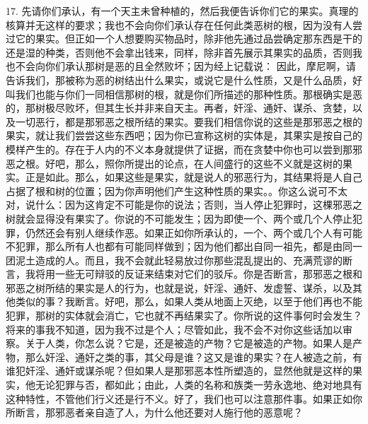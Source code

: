 17. 先请你们承认，有一个天主未曾种植的，然后我便告诉你们它的果实。真理的核算并无这样的要求；我也不会向你们承认存在任何此类恶树的根，因为没有人尝过它的果实。但正如一个人想要购买物品时，除非他先通过品尝确定那东西是干的还是湿的种类，否则他不会拿出钱来，同样，除非首先展示其果实的品质，否则我也不会向你们承认那树是恶的且全然败坏；因为经上记载说： 因此，摩尼啊，请告诉我们，那被称为恶的树结出什么果实，或说它是什么性质，又是什么品质，好叫我们也能与你们一同相信那树的根，就是你们所描述的那种性质。那根确实是恶的，那树极尽败坏，但其生长并非来自天主。再者，奸淫、通奸、谋杀、贪婪，以及一切恶行，都是那邪恶之根所结的果实。要我们相信你说的这些是那邪恶之根的果实，就让我们尝尝这些东西吧；因为你已宣称这树的实体是，其果实是按自己的模样产生的。存在于人内的不义本身就提供了证据，而在贪婪中你也可以尝到那邪恶之根。好吧，那么，照你所提出的论点，在人间盛行的这些不义就是这树的果实。正是如此。那么，如果这些是果实，就是说人的邪恶行为，其结果将是人自己占据了根和树的位置；因为你声明他们产生这种性质的果实。。你这么说可不太对，说什么：因为这肯定不可能是你的说法；否则，当人停止犯罪时，这棵邪恶之树就会显得没有果实了。你说的不可能发生；因为即使一个、两个或几个人停止犯罪，仍然还会有别人继续作恶。如果正如你所承认的，一个、两个或几个人有可能不犯罪，那么所有人也都有可能同样做到；因为他们都出自同一祖先，都是由同一团泥土造成的人。而且，我不会就此轻易放过你那些混乱提出的、充满荒谬的断言，我将用一些无可辩驳的反证来结束对它们的驳斥。你是否断言，那邪恶之根和邪恶之树所结的果实是人的行为，也就是说，奸淫、通奸、发虚誓、谋杀，以及其他类似的事？我断言。好吧，那么，如果人类从地面上灭绝，以至于他们再也不能犯罪，那树的实体就会消亡，它也就不再结果实了。你所说的这件事何时会发生？将来的事我不知道，因为我不过是个人；尽管如此，我不会不对你这些话加以审察。关于人类，你怎么说？它是，还是被造的产物？它是被造的产物。如果人是产物，那么奸淫、通奸之类的事，其父母是谁？这又是谁的果实？在人被造之前，有谁犯奸淫、通奸或谋杀呢？但如果人是那邪恶本性所塑造的，显然他就是这样的果实，他无论犯罪与否，都如此；由此，人类的名称和族类一劳永逸地、绝对地具有这种特性，不管他们行义还是行不义。好了，我们也可以注意那件事。如果正如你所断言，那邪恶者亲自造了人，为什么他还要对人施行他的恶意呢？\par

